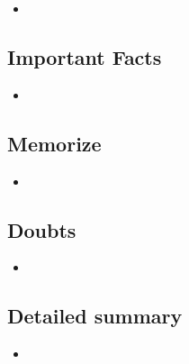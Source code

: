 \documentclass{article}
\begin{document}
    \begin{itemize}

    \item 
    
    \end{itemize}

\subsection{Important Facts}

    \begin{itemize}

    \item 
    
    \end{itemize}

\subsection{Memorize}

    \begin{itemize}

    \item 
    
    \end{itemize}

\subsection{Doubts}

    \begin{itemize}

    \item 
    
    \end{itemize}

\subsection{Detailed summary}

    \begin{itemize}

    \item 
    
    \end{itemize}
\end{document}

